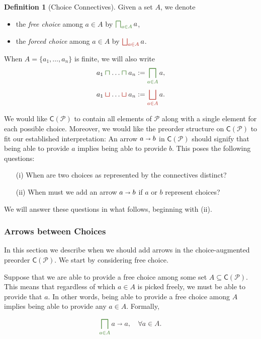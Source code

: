 \documentclass[12pt]{article}
\theoremstyle{definition}
\newtheorem{definition}{Definition}[section]
\theoremstyle{plain}
\theoremstyle{plain}
\theoremstyle{plain}
\theoremstyle{plain}
\theoremstyle{remark}
\theoremstyle{remark}
\newcommand{\mc}[1]{\mathcal{#1}}
\newcommand{\sub}{\subseteq}
\newcommand{\cbigsqcap}[1]{\color{OliveGreen}\bigsqcap_{#1}\color{Black}}
\newcommand{\csqcap}{\color{OliveGreen}\bm{\sqcap}\color{Black}}
\newcommand{\cbigsqcup}[1]{\color{BrickRed}\bigsqcup_{#1}\color{Black}}
\newcommand{\csqcup}{\color{BrickRed}\bm{\sqcup}\color{Black}}
\begin{document}
\begin{definition}[Choice Connectives] Given a set $A$, we denote
	\begin{itemize}
		\item the \emph{free choice} among $a \in A$ by $\cbigsqcap{a \in A} a$,
		\item the \emph{forced choice} among $a \in A$ by $\cbigsqcup{a \in A} a$.
	\end{itemize}
	When $A=\{a_1,\ldots,a_n\}$ is finite, we will also write 
	$$a_1 \csqcap \ldots \csqcap a_n := \cbigsqcap{a \in A} a,$$
	$$a_1 \csqcup \ldots \csqcup a_n := \cbigsqcup{a \in A} a.$$
\end{definition}

We would like $\mathsf{C}(\mc{P})$ to contain all elements of $\mc{P}$ along with a single element for each possible choice. Moreover, we would like the preorder structure on $\mathsf{C}(\mc{P})$ to fit our established interpretation: An arrow $a \shortrightarrow b$ in $\mathsf{C}(\mc{P})$ should signify that being able to provide $a$ implies being able to provide $b$. This poses the following questions:
\begin{itemize}
	\item[(i)] When are two choices as represented by the connectives distinct?
	\item[(ii)] When must we add an arrow $a \shortrightarrow b$ if $a$ or $b$ represent choices?
\end{itemize}
We will answer these questions in what follows, beginning with (ii).

\subsubsection{Arrows between Choices}\label{sec:intr free}
In this section we describe when we should add arrows in the choice-augmented preorder $\mathsf{C}(\mc{P})$. We start by considering free choice.

Suppose that we are able to provide a free choice among some set $A \sub \mathsf{C}(\mc{P})$. This means that regardless of which $a \in A$ is picked freely, we must be able to provide that $a$. In other words, being able to provide a free choice among $A$ implies being able to provide any $a \in A$. Formally,


\begin{equation}\label{eq:meet 1}
	\cbigsqcap{a \in A} a \shortrightarrow a, \quad \forall a \in A.
\end{equation}
\end{document}
